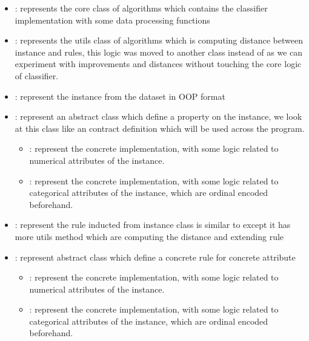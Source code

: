 \documentclass{article}
\begin{document}
\begin{itemize}
    \item {}: represents the core class of algorithms which contains the classifier implementation with some 
    data processing functions
    \item {}: represents the utils class of algorithms which is computing distance between instance and rules, this logic
    was moved to another class instead of  as we can experiment with improvements and distances without touching the
    core logic of classifier.
    \item {}: represent the instance from the dataset in OOP format
    \item {}: represent an abstract class which define a property on the instance, we look at this 
    class like an contract definition which will be used across the program.
        \begin{itemize}
        \item {}: represent the concrete implementation, with some 
        logic related to numerical attributes of the instance.
        \item {}: represent the concrete implementation, with some 
        logic related to categorical attributes of the instance, which are ordinal encoded beforehand.
        \end{itemize}
    \item {}: represent the rule inducted from instance class is similar to 
    except it has more utils method which are computing the distance and extending rule
    \item {}: represent abstract class which define a concrete rule for concrete
    attribute
    \begin{itemize}
        \item {}: represent the concrete implementation, with some 
        logic related to numerical attributes of the instance.
        \item {}: represent the concrete implementation, with some 
        logic related to categorical attributes of the instance, which are ordinal encoded beforehand.
        \end{itemize}
  \end{itemize}
 
\end{document}
